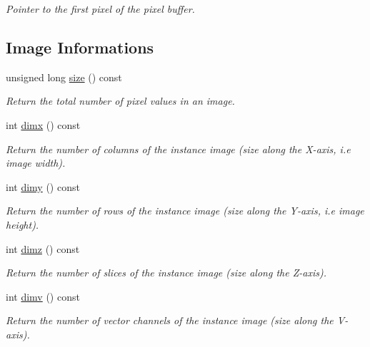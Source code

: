 \begin{DoxyCompactItemize}
\begin{DoxyCompactList}\small\item\em Pointer to the first pixel of the pixel buffer. \item\end{DoxyCompactList}\end{DoxyCompactItemize}
\subsection*{Image Informations}
\label{_amgrp52d1d405e7ef529979ddca00c22b298d}
 \begin{DoxyCompactItemize}
\item 
unsigned long \hyperlink{structcimg__library_1_1_c_img_a4f22f4188289724c853ed6a12b0a2e1e}{size} () const 
\begin{DoxyCompactList}\small\item\em Return the total number of pixel values in an image. \item\end{DoxyCompactList}\item 
int \hyperlink{structcimg__library_1_1_c_img_abf1a3c383880a20428b2ea9d22f3c06e}{dimx} () const 
\begin{DoxyCompactList}\small\item\em Return the number of columns of the instance image (size along the X-\/axis, i.e image width). \item\end{DoxyCompactList}\item 
int \hyperlink{structcimg__library_1_1_c_img_aa1e128f9d950b39ed312eb368741970c}{dimy} () const 
\begin{DoxyCompactList}\small\item\em Return the number of rows of the instance image (size along the Y-\/axis, i.e image height). \item\end{DoxyCompactList}\item 
int \hyperlink{structcimg__library_1_1_c_img_aba56e96a615d71ed9a71009768fc4b75}{dimz} () const 
\begin{DoxyCompactList}\small\item\em Return the number of slices of the instance image (size along the Z-\/axis). \item\end{DoxyCompactList}\item 
int \hyperlink{structcimg__library_1_1_c_img_ad30f8300f32a94a80e1e06c84a45de49}{dimv} () const 
\begin{DoxyCompactList}\small\item\em Return the number of vector channels of the instance image (size along the V-\/axis). \item\end{DoxyCompactList}\item 

\end{DoxyCompactItemize}
